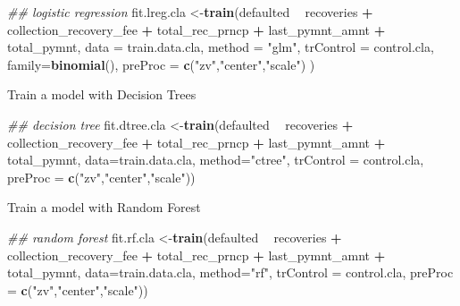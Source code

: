 \documentclass[]{article}
\newenvironment{Shaded}{\begin{snugshade}}{\end{snugshade}}
\newcommand{\CommentTok}[1]{\textcolor[rgb]{0.56,0.35,0.01}{\textit{#1}}}
\newcommand{\DataTypeTok}[1]{\textcolor[rgb]{0.13,0.29,0.53}{#1}}
\newcommand{\KeywordTok}[1]{\textcolor[rgb]{0.13,0.29,0.53}{\textbf{#1}}}
\newcommand{\NormalTok}[1]{#1}
\newcommand{\OperatorTok}[1]{\textcolor[rgb]{0.81,0.36,0.00}{\textbf{#1}}}
\newcommand{\StringTok}[1]{\textcolor[rgb]{0.31,0.60,0.02}{#1}}
\begin{document}
\begin{Shaded}
\begin{Highlighting}[]
\CommentTok{## logistic regression}
\NormalTok{fit.lreg.cla <-}\KeywordTok{train}\NormalTok{(defaulted }\OperatorTok{~}\StringTok{ }\NormalTok{recoveries }\OperatorTok{+}\StringTok{ }\NormalTok{collection_recovery_fee }\OperatorTok{+}\StringTok{ }\NormalTok{total_rec_prncp }
\OperatorTok{+}\StringTok{ }\NormalTok{last_pymnt_amnt }\OperatorTok{+}\StringTok{ }\NormalTok{total_pymnt, }
                \DataTypeTok{data =}\NormalTok{ train.data.cla, }
                \DataTypeTok{method =} \StringTok{"glm"}\NormalTok{,}
                \DataTypeTok{trControl =}\NormalTok{ control.cla,}
                \DataTypeTok{family=}\KeywordTok{binomial}\NormalTok{(),}
                \DataTypeTok{preProc =} \KeywordTok{c}\NormalTok{(}\StringTok{"zv"}\NormalTok{,}\StringTok{"center"}\NormalTok{,}\StringTok{"scale"}\NormalTok{)}
\NormalTok{                ) }
\end{Highlighting}
\end{Shaded}

Train a model with Decision Trees

\begin{Shaded}
\begin{Highlighting}[]
\CommentTok{## decision tree }
\NormalTok{fit.dtree.cla <-}\KeywordTok{train}\NormalTok{(defaulted }\OperatorTok{~}\StringTok{ }\NormalTok{recoveries }\OperatorTok{+}\StringTok{ }\NormalTok{collection_recovery_fee }\OperatorTok{+}\StringTok{ }\NormalTok{total_rec_prncp }
\OperatorTok{+}\StringTok{ }\NormalTok{last_pymnt_amnt }\OperatorTok{+}\StringTok{ }\NormalTok{total_pymnt, }
               \DataTypeTok{data=}\NormalTok{train.data.cla,}
               \DataTypeTok{method=}\StringTok{"ctree"}\NormalTok{,}
               \DataTypeTok{trControl =}\NormalTok{ control.cla,}
               \DataTypeTok{preProc =} \KeywordTok{c}\NormalTok{(}\StringTok{"zv"}\NormalTok{,}\StringTok{"center"}\NormalTok{,}\StringTok{"scale"}\NormalTok{))}
\end{Highlighting}
\end{Shaded}

Train a model with Random Forest

\begin{Shaded}
\begin{Highlighting}[]
\CommentTok{## random forest }
\NormalTok{fit.rf.cla <-}\KeywordTok{train}\NormalTok{(defaulted }\OperatorTok{~}\StringTok{ }\NormalTok{recoveries }\OperatorTok{+}\StringTok{ }\NormalTok{collection_recovery_fee }\OperatorTok{+}\StringTok{ }\NormalTok{total_rec_prncp }
\OperatorTok{+}\StringTok{ }\NormalTok{last_pymnt_amnt }\OperatorTok{+}\StringTok{ }\NormalTok{total_pymnt, }
               \DataTypeTok{data=}\NormalTok{train.data.cla,}
               \DataTypeTok{method=}\StringTok{"rf"}\NormalTok{,}
               \DataTypeTok{trControl =}\NormalTok{ control.cla,}
               \DataTypeTok{preProc =} \KeywordTok{c}\NormalTok{(}\StringTok{"zv"}\NormalTok{,}\StringTok{"center"}\NormalTok{,}\StringTok{"scale"}\NormalTok{))}
\end{Highlighting}
\end{Shaded}
\end{document}
